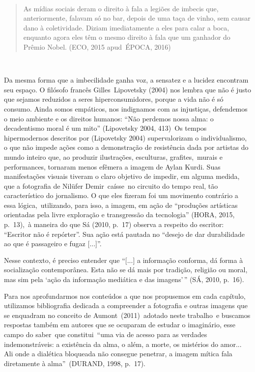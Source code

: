 \documentclass[
  letterpaper,
]{abntex2}
\begin{document}
~

\begin{quote}
As mídias sociais deram o direito à fala a legiões de imbecis que,
anteriormente, falavam só no bar, depois de uma taça de vinho, sem
causar dano à coletividade. Diziam imediatamente a eles para calar a
boca, enquanto agora eles têm o mesmo direito à fala que um ganhador do
Prêmio Nobel. (ECO, 2015 apud~ÉPOCA, 2016)~
\end{quote}

~

Da mesma forma que a imbecilidade ganha voz, a sensatez e a lucidez
encontram seu espaço. O filósofo francês Gilles~Lipovetsky (2004) nos
lembra que não é justo que sejamos reduzidos a seres hiperconsumidores,
porque a vida não é só consumo. Ainda somos empáticos, nos indignamos
com as injustiças, defendemos o meio ambiente e os direitos humanos:
``Não perdemos nossa alma: o decadentismo moral é um mito'' (Lipovetsky
2004, 413)~Os tempos hipermodernos descritos por (Lipovetsky 2004)
supervalorizam o individualismo, o que não impede ações como a
demonstração de resistência dada por artistas do mundo inteiro que, ao
produzir ilustrações, esculturas, grafites,~murais e performances,
tornaram menos efêmera a imagem de Aylan Kurdi. Suas manifestações
visuais tiveram o claro objetivo de impedir, em alguma medida, que a
fotografia de Nilüfer Demir~caísse~no circuito do tempo real, tão
característico do jornalismo. O que eles fizeram foi um movimento
contrário a essa lógica,~utilizando, para isso, a imagem, em ação de
``produções artísticas orientadas pela livre exploração e transgressão
da tecnologia'' (HORA, 2015, p.~13),~à maneira do que Sá (2010, p.~17)
observa a respeito do escritor: ``Escritor não é repórter''. Sua ação
está pautada no ``desejo de dar durabilidade ao que é passageiro e fugaz
{[}...{]}''.

Nesse contexto, é preciso entender que ``{[}...{]} a informação
conforma, dá forma à socialização contemporânea. Esta não se dá mais por
tradição, religião ou moral, mas sim pela `ação da informação mediática
e das imagens'\,'' (SÁ, 2010, p.~16).

Para nos aprofundarmos nos conteúdos a que nos propusemos em cada
capítulo, utilizamos bibliografia dedicada a compreender a fotografia e
outras imagens que se enquadram no conceito de Aumont~(2011)~adotado
neste trabalho~e buscamos respostas também em autores que se ocuparam de
estudar o imaginário, esse campo do saber~que constitui~``uma via de
acesso para as verdades indemonstráveis: a existência da alma, o além, a
morte, os mistérios do amor... Ali onde a dialética bloqueada não
consegue penetrar, a imagem mítica fala diretamente à alma''~(DURAND,
1998, p.~17).
\end{document}

